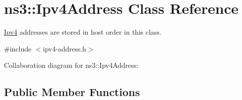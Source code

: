 \hypertarget{classns3_1_1Ipv4Address}{}\section{ns3\+:\+:Ipv4\+Address Class Reference}
\label{classns3_1_1Ipv4Address}


\hyperlink{classns3_1_1Ipv4}{Ipv4} addresses are stored in host order in this class.  




{\ttfamily \#include $<$ipv4-\/address.\+h$>$}



Collaboration diagram for ns3\+:\+:Ipv4\+Address\+:
\subsection*{Public Member Functions}
